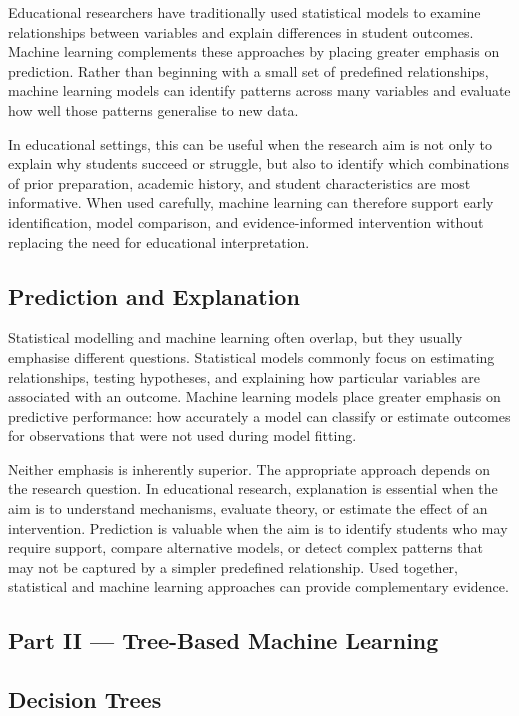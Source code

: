 Educational researchers have traditionally used statistical models to examine relationships between variables and explain differences in student outcomes. 
Machine learning complements these approaches by placing greater emphasis on prediction. Rather than beginning with a small set of predefined relationships, 
machine learning models can identify patterns across many variables and evaluate how well those patterns generalise to new data.

In educational settings, this can be useful when the research aim is not only to explain why students succeed or struggle, but also to identify which 
combinations of prior preparation, academic history, and student characteristics are most informative. When used carefully, machine learning can therefore 
support early identification, model comparison, and evidence-informed intervention without replacing the need for educational interpretation.

\subsection{Prediction and Explanation}

Statistical modelling and machine learning often overlap, but they usually emphasise different questions. Statistical models commonly focus on estimating relationships, 
testing hypotheses, and explaining how particular variables are associated with an outcome. Machine learning models place greater emphasis on predictive performance: how 
accurately a model can classify or estimate outcomes for observations that were not used during model fitting.

Neither emphasis is inherently superior. The appropriate approach depends on the research question. In educational research, explanation is essential when the aim is to 
understand mechanisms, evaluate theory, or estimate the effect of an intervention. Prediction is valuable when the aim is to identify students who may require support, 
compare alternative models, or detect complex patterns that may not be captured by a simpler predefined relationship. Used together, statistical and machine learning 
approaches can provide complementary evidence.
\subsection*{Part II — Tree-Based Machine Learning}
\subsection{Decision Trees}

